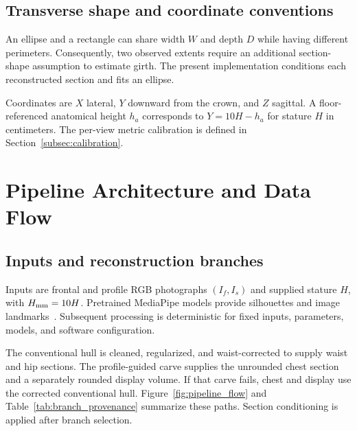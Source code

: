 \documentclass[11pt,a4paper]{article}
\numberwithin{equation}{section}
\begin{document}
\subsection{Transverse shape and coordinate conventions}
An ellipse and a rectangle can share width $W$ and depth $D$ while having different perimeters. Consequently, two observed extents require an additional section-shape assumption to estimate girth. The present implementation conditions each reconstructed section and fits an ellipse.

Coordinates are $X$ lateral, $Y$ downward from the crown, and $Z$ sagittal. A floor-referenced anatomical height $h_a$ corresponds to $Y=10H-h_a$ for stature $H$ in centimeters. The per-view metric calibration is defined in Section~\ref{subsec:calibration}.

\section{Pipeline Architecture and Data Flow}
\label{sec:system_pipeline}

\subsection{Inputs and reconstruction branches}
Inputs are frontal and profile RGB photographs $(I_f,I_s)$ and supplied stature $H$, with $H_{\rm mm}=10H$. Pretrained MediaPipe models provide silhouettes and image landmarks~\cite{lugaresi2019mediapipe,mediapipeguide}. Subsequent processing is deterministic for fixed inputs, parameters, models, and software configuration.

The conventional hull is cleaned, regularized, and waist-corrected to supply waist and hip sections. The profile-guided carve supplies the unrounded chest section and a separately rounded display volume. If that carve fails, chest and display use the corrected conventional hull. Figure~\ref{fig:pipeline_flow} and Table~\ref{tab:branch_provenance} summarize these paths. Section conditioning is applied after branch selection.
\end{document}
